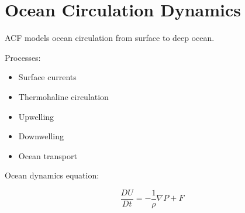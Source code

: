 \section{Ocean Circulation Dynamics}


ACF models ocean circulation from surface to deep ocean.



Processes:


\begin{itemize}

\item Surface currents

\item Thermohaline circulation

\item Upwelling

\item Downwelling

\item Ocean transport

\end{itemize}



Ocean dynamics equation:


\[
\frac{DU}{Dt}
=
-\frac{1}{\rho}\nabla P
+
F
\]
